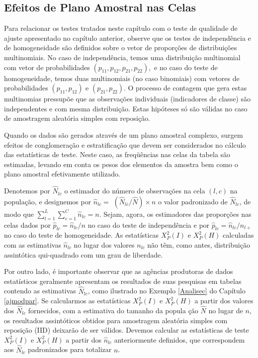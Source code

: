 \documentclass[]{book}
\numberwithin{example}{chapter}
\numberwithin{remark}{chapter}
\numberwithin{definition}{chapter}
\begin{document}
\subsection{Efeitos de Plano Amostral nas
Celas}\label{efeitos-de-plano-amostral-nas-celas}

Para relacionar os testes tratados neste capítulo com o teste de
qualidade de ajuste apresentado no capítulo anterior, observe que os
testes de independência e de homogeneidade são definidos sobre o vetor
de proporções de distribuições multinomiais. No caso de independência,
temos uma distribuição multinomial com vetor de probabilidades
\(\left( p_{11},p_{12},p_{21},p_{22}\right) ,\) e no caso do teste de
homogeneidade, temos duas multinomiais (no caso binomiais) com vetores
de probabilidades \(\left( p_{11},p_{12}\right)\) e
\(\left( p_{21},p_{22}\right)\). O processo de contagem que gera estas
multinomias pressupõe que as observações individuais (indicadores de
classe) são independentes e com mesma distribuição. Estas hipóteses só
são válidas no caso de amostragem aleatória simples com reposição.

Quando os dados são gerados através de um plano amostral complexo,
surgem efeitos de conglomeração e estratificação que devem ser
considerados no cálculo das estatísticas de teste. Neste caso, as
freqüências nas celas da tabela são estimadas, levando em conta os pesos
dos elementos da amostra bem como o plano amostral efetivamente
utilizado.

Denotemos por \(\hat{N}_{lc}\) o estimador do número de observações na
cela \(\left( l,c\right)\) na população, e designemos por
\(\hat{n}_{lc}=\) \(\left( \hat{N}_{lc}/\hat{N}\right) \times n\) o
valor padronizado de \(\hat{N}_{lc}\), de modo que
\(\sum\limits_{l=1}^{L}\sum\limits_{c=1}^{C}\hat{n}_{lc}=n\). Sejam,
agora, os estimadores das proporções nas celas dados por
\(\hat{p}_{lc}=\hat{n}_{lc}/n\) no caso do teste de independência e por
\(\hat{p}_{lc}=\hat{n}_{lc}/n_{l+}\) no caso do teste de homogeneidade.
As estatísticas \(X_{P}^{2}\left( I\right)\) e
\(X_{P}^{2}\left(H\right)\) calculadas com as estimativas
\(\hat{n}_{lc}\) no lugar dos valores \(n_{lc}\) não têm, como antes,
distribuição assintótica qui-quadrado com um grau de liberdade.

Por outro lado, é importante observar que as agências produtoras de
dados estatísticos geralmente apresentam os resultados de suas pesquisas
em tabelas contendo as estimativas \(\hat{N}_{lc}\), como ilustrado no
Exemplo \ref{Analisec} do Capítulo \ref{ajmodpar}. Se calcularmos as
estatísticas \(X_{P}^{2}\left( I\right)\) e \(X_{P}^{2}\left( H\right)\)
a partir dos valores dos \(\hat{N}_{lc}\) fornecidos, com a estimativa
do tamanho da popula ção \(\hat{N}\) no lugar de \(n\), os resultados
assintóticos obtidos para amostragem aleatória simples com reposição
(IID) deixarão de ser válidos. Devemos calcular as estatísticas de teste
\(X_{P}^{2}\left( I\right)\) e \(X_{P}^{2}\left( H\right)\) a partir dos
\(\hat{n}_{lc}\) anteriormente definidos, que correspondem aos
\(\hat{N}_{lc}\) padronizados para totalizar \(n\).
\end{document}
